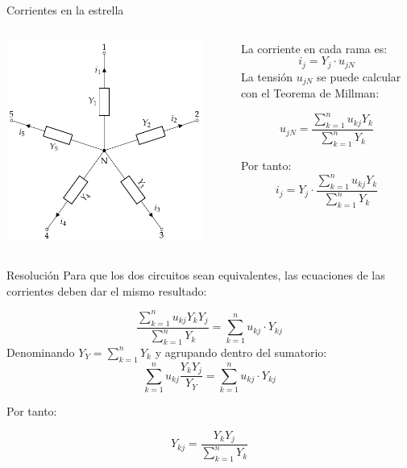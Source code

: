 \documentclass[aspectratio=169, usenames,svgnames,dvipsnames]{beamer}
\begin{document}
\begin{frame}[label={sec:org39adcaf}]{Corrientes en la estrella}
\begin{columns}
\begin{column}{0.5\columnwidth}
\begin{center}
\includegraphics[width=0.9\textwidth]{../figs/Rosen_Y.pdf}
\end{center}
\end{column}

\begin{column}{0.5\columnwidth}
La corriente en cada rama es:
\[
  i_j = Y_j \cdot u_{jN}
\]
La tensión \(u_{jN}\) se puede calcular con el Teorema de Millman:

\[
  u_{jN} = \frac{\sum_{k = 1}^n u_{kj} Y_k}{\sum_{k  = 1}^n Y_k}
\]

Por tanto:
\[
  i_j = Y_j \cdot \frac{\sum_{k = 1}^n u_{kj} Y_k}{\sum_{k  = 1}^n Y_k}
\]
\end{column}
\end{columns}
\end{frame}

\begin{frame}[label={sec:org8837ce2}]{Resolución}
Para que los dos circuitos sean equivalentes, las ecuaciones de las corrientes deben dar el mismo resultado:

\[
  \frac{\sum_{k = 1}^n u_{kj} Y_k Y_j}{\sum_{k  = 1}^n Y_k} = \sum_{k = 1}^n u_{kj} \cdot Y_{kj}  
\]
Denominando \(Y_Y = \sum_{k  = 1}^n Y_k\) y agrupando dentro del sumatorio:
\[
  \sum_{k = 1}^n u_{kj} \frac{Y_k Y_j}{Y_Y} = \sum_{k = 1}^n u_{kj} \cdot Y_{kj}  
\]

Por tanto:

\[
  \boxed{Y_{kj} = \frac{Y_k Y_j}{\sum_{k  = 1}^n Y_k}}
\]
\end{frame}
\end{document}
